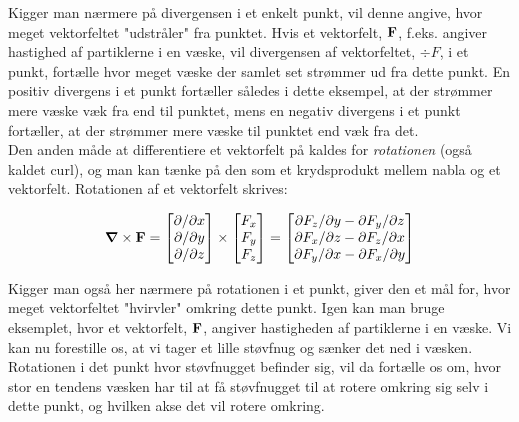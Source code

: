 Kigger man nærmere på divergensen i et enkelt punkt, vil denne angive, hvor meget vektorfeltet "udstråler" fra punktet. Hvis et vektorfelt, $\mathbf{F}$, f.eks. angiver hastighed af partiklerne i en væske, vil divergensen af vektorfeltet, $\div{F}$, i et punkt, fortælle hvor meget væske der samlet set strømmer ud fra dette punkt. En positiv divergens i et punkt fortæller således i dette eksempel, at der strømmer mere væske væk fra end til punktet, mens en negativ divergens i et punkt fortæller, at der strømmer mere væske til punktet end væk fra det.\\

Den anden måde at differentiere et vektorfelt på kaldes for \emph{rotationen} (også kaldet curl), og man kan tænke på den som et krydsprodukt mellem nabla og et vektorfelt. Rotationen af et vektorfelt skrives:

\begin{equation}
\mbox{\boldmath$ \nabla $} \times \mathbf{\mathbf{F}} = \begin{bmatrix} \partial  / \partial x \\ \partial  / \partial y \\ \partial  / \partial z \end{bmatrix} \times \begin{bmatrix} F_x \\ F_y \\ F_z \end{bmatrix} = \begin{bmatrix} \partial F_z/\partial y - \partial F_y/\partial z \\ \partial F_x/\partial z - \partial F_z/\partial x \\ \partial F_y/\partial x - \partial F_x/\partial y \end{bmatrix} 
\end{equation}

\vspace{2mm}

Kigger man også her nærmere på rotationen i et punkt, giver den et mål for, hvor meget vektorfeltet "hvirvler" omkring dette punkt. Igen kan man bruge eksemplet, hvor et vektorfelt, $\mathbf{F}$, angiver hastigheden af partiklerne i en væske. Vi kan nu forestille os, at vi tager et lille støvfnug og sænker det ned i væsken. Rotationen i det punkt hvor støvfnugget befinder sig, vil da fortælle os om, hvor stor en tendens væsken har til at få støvfnugget til at rotere omkring sig selv i dette punkt, og hvilken akse det vil rotere omkring.\\

